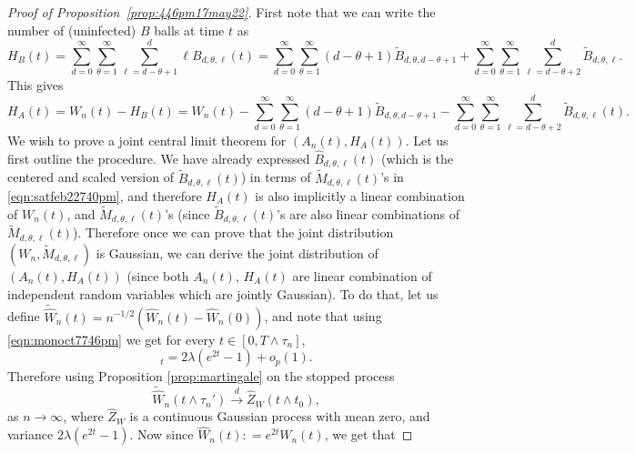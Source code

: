 \documentclass[11pt]{article}
\def\tod{\stackrel{d}{\longrightarrow}}
\def\tod{\stackrel{d}{\longrightarrow}}
\begin{document}
\begin{proof}[Proof of Proposition~\ref{prop:446pm17may22}]
First note that we can write the number of (uninfected) $B$ balls at time $t$ as
\begin{equation*}
H_B(t)= \sum_{d=0}^{\infty}\sum_{\theta=1}^{\infty}\sum_{ \ell= d-\theta+1}^d \ell B_{d, \theta,\ell}(t)=\sum_{d=0}^{\infty}\sum_{\theta=1}^{\infty}(d-\theta+1)\widetilde{B}_{d,\theta, d-\theta+1} +  \sum_{d=0}^{\infty}\sum_{\theta=1}^{\infty}\sum_{ \ell= d-\theta+2}^d\widetilde{B}_{d,\theta, \ell}.
\end{equation*}
This gives
\begin{equation}
    \label{eqn:336pm16may22}
   H_A(t)= W_n(t)-H_B(t)= W_n(t) -\sum_{d=0}^{\infty}\sum_{\theta=1}^{\infty}(d-\theta+1)\widetilde{B}_{d,\theta, d-\theta+1} -  \sum_{d=0}^{\infty}\sum_{\theta=1}^{\infty}\sum_{ \ell= d-\theta+2}^d\widetilde{B}_{d,\theta, \ell}(t).  
\end{equation}
We wish to prove a joint central limit theorem for $(A_n(t), H_A(t))$. Let us first outline the procedure. 
We have already expressed $\widehat{B}_{d,\theta, \ell}(t)$ (which is the centered and scaled version of $\widetilde{B}_{d,\theta, \ell}(t)$) in terms of $\widetilde{M}_{d,\theta,\ell}(t)$'s in \eqref{eqn:satfeb22740pm}, and therefore $H_A(t)$ is also implicitly a linear combination of $W_n(t)$, and $\widetilde{M}_{d,\theta,\ell}(t)$'s (since $\widetilde{B}_{d,\theta, \ell}(t)$'s are also linear combinations of $\widetilde{M}_{d,\theta,\ell}(t)$). Therefore once we can prove that the joint distribution $(W_n, \widetilde{M}_{d,\theta,\ell})$ is Gaussian, we can derive the joint distribution of $(A_n(t), H_A(t))$ (since both $A_n(t)$, $H_A(t)$ are linear combination of independent random variables which are jointly Gaussian).  To do that, let us define $\widetilde{\widehat{W}}_n(t)= n^{-1/2}\left(\widehat{W}_n(t)-\widehat{W}_n(0)\right) $, and note that using \eqref{eqn:monoct7746pm} we get for every $t \in [0, T\wedge \tau_n]$,
\begin{equation}
    [\widetilde{\widehat{W}}_n, \widetilde{\widehat{W}}_n]_{t}=  2\lambda(e^{2t}-1) +o_p(1).
\end{equation}
Therefore using Proposition \ref{prop:martingale} on the stopped process
\begin{equation*}
    \widetilde{\widehat{W}}_n(t\wedge \tau_n') \tod \widehat{Z}_W(t\wedge t_0),
\end{equation*}
as $n\to \infty$, where $\widehat{Z}_W$ is a continuous Gaussian process with mean zero, and variance $2\lambda(e^{2t}-1)$. Now since $\widehat{W}_n(t) : = e^{2t} W_n(t)$, we get that

\end{proof}
\end{document}
